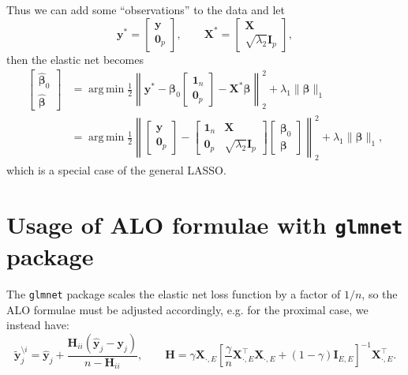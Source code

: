 \documentclass[11pt]{article}
\newcommand{\by}{\bm{y}}
\newcommand{\bH}{\bm{H}}
\newcommand{\bI}{\bm{I}}
\newcommand{\bX}{\bm{X}}
\newcommand{\bbeta}{\bm{\beta}}
\DeclareMathOperator*{\argmin}{arg\,min}
\begin{document}
Thus we can add some ``observations'' to the data and let
$$\by^\ast = \begin{bmatrix}
\by \\
\bm0_p
\end{bmatrix},\qquad \bX^\ast =
\begin{bmatrix}
\bX \\
\sqrt{\lambda_2} \bm{I}_p
\end{bmatrix}, $$
then the elastic net becomes
	\begin{equation}
		\begin{aligned}
		\begin{bmatrix}
		\hat{\bbeta}_0 \\
		\hat{\bbeta}
		\end{bmatrix} &= \argmin\frac{1}{2} \left\|\by^\ast - \bbeta_0
		\begin{bmatrix}
		\bm{1}_n \\
		\bm{0}_p
		\end{bmatrix} - \bX^\ast\bbeta\right\|_2^2 + \lambda_1 \|\bbeta\|_1  \\
		&= \argmin\frac{1}{2} \left\|
		\begin{bmatrix}
		\by \\
		\bm0_p
		\end{bmatrix}
		- 
		\begin{bmatrix}
		\bm{1}_n & \bX \\
		\bm{0}_p &\sqrt{\lambda_2} \bm{I}_p
		\end{bmatrix}  
		\begin{bmatrix}
		\bbeta_0 \\
		\bbeta
		\end{bmatrix} 
		\right \|_2^2 + \lambda_1 \|\bbeta\|_1,
		\end{aligned}
	\end{equation}
which is a special case of the general LASSO.

\section{Usage of ALO formulae with \texttt{glmnet} package}
The \verb|glmnet| package scales the elastic net loss function by a factor of \(1/n\), so the ALO formulae must be adjusted accordingly, e.g. for the proximal case, we instead have: \[\tilde{\by}_j^{\setminus i}=\hat{\by}_j+\frac{\bH_{ii}(\hat{\by}_j-\by_j)}{n-\bH_{ii}},\qquad\bH=\gamma\bX_{\cdot,E}\left[\frac{\gamma}{n}\bX_{\cdot,E}^\top\bX_{\cdot,E}+\left(1-\gamma\right)\bI_{E,E}\right]^{-1}\bX_{\cdot,E}^\top.\]
\end{document}
